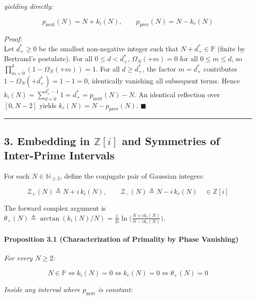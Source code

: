 \documentclass[
  11pt,
]{article}
\begin{document}
\emph{yielding directly:}

\[p_{\text{next}}(N) = N + k_i(N), \qquad p_{\text{prev}}(N) = N - k_r(N)\]

\emph{Proof:}\\
Let \(d_+^* \ge 0\) be the smallest non-negative integer such that
\(N + d_+^* \in \mathbb{P}\) (finite by Bertrand's postulate). For all
\(0 \le d < d_+^*\), \(\Omega_N(+m) = 0\) for all \(0 \le m \le d\), so
\(\prod_{m=0}^d (1 - \Omega_N(+m)) = 1\). For all \(d \ge d_+^*\), the
factor \(m = d_+^*\) contributes \(1 - \Omega_N(+d_+^*) = 1 - 1 = 0\),
identically vanishing all subsequent terms. Hence
\(k_i(N) = \sum_{d=0}^{d_+^*-1} 1 = d_+^* = p_{\text{next}}(N) - N\). An
identical reflection over \([0, N-2]\) yields
\(k_r(N) = N - p_{\text{prev}}(N)\). \(\blacksquare\)

\begin{center}\rule{0.5\linewidth}{0.5pt}\end{center}

\subsection{\texorpdfstring{3. Embedding in \(\mathbb{Z}[i]\) and
Symmetries of Inter-Prime
Intervals}{3. Embedding in \textbackslash mathbb\{Z\}{[}i{]} and Symmetries of Inter-Prime Intervals}}\label{embedding-in-mathbbzi-and-symmetries-of-inter-prime-intervals}

For each \(N \in \mathbb{N}_{\ge 2}\), define the conjugate pair of
Gaussian integers:

\[\mathcal{Z}_+(N) \triangleq N + i \, k_i(N), \qquad \mathcal{Z}_-(N) \triangleq N - i \, k_r(N) \quad \in \mathbb{Z}[i]\]

The forward complex argument is
\(\theta_+(N) \triangleq \arctan(k_i(N)/N) = \frac{1}{2i}\ln\big(\frac{N + i k_i(N)}{N - i k_i(N)}\big)\).

\paragraph{Proposition 3.1 (Characterization of Primality by Phase
Vanishing)}\label{proposition-3.1-characterization-of-primality-by-phase-vanishing}

\emph{For every \(N \ge 2\):}

\[N \in \mathbb{P} \iff k_i(N) = 0 \iff k_r(N) = 0 \iff \theta_+(N) = 0\]

\emph{Inside any interval where \(p_{\text{next}}\) is constant:}
\end{document}
